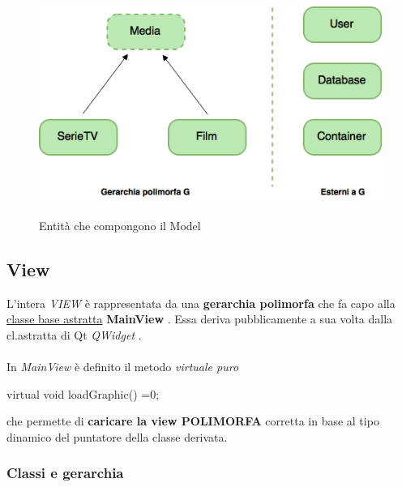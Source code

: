 \documentclass[10pt,a4paper,openany]{article}
\begin{document}
		\begin{figure}
			\centering
			\includegraphics[angle=0,scale=.45]{Model.png}\\
			\caption{Entità che compongono il Model}
			\label{fig:Model}
		\end{figure}\vspace{20pt}


\newpage
	
	
	\subsection{View}
	
	L'intera \emph{VIEW} è rappresentata da una \textbf{gerarchia polimorfa} che fa capo alla \underline{classe base astratta} \textbf{MainView} .
	Essa deriva pubblicamente a sua volta dalla cl.astratta di Qt \emph{QWidget} .\\\\
	In \emph{MainView} è definito il metodo \textit{virtuale puro} 
	\begin{CPP}
		virtual void loadGraphic() =0;
	\end{CPP}
	che permette di \textbf{caricare la view POLIMORFA} corretta in base al tipo dinamico del puntatore della classe derivata.
	
		\subsubsection{Classi e gerarchia }
\end{document}
